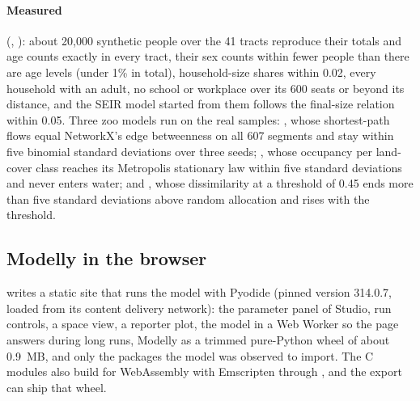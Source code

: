 \paragraph{Measured} (, ): about 20,000 synthetic people
over the 41 tracts reproduce their totals and age counts exactly in every tract, their sex
counts within fewer people than there are age levels (under 1\% in total), household-size
shares within 0.02, every household with an adult, no school or workplace over its 600
seats or beyond its distance, and the SEIR model started from them follows the final-size
relation within 0.05. Three zoo models run on the real samples: , whose
shortest-path flows equal NetworkX's edge betweenness on all 607 segments and stay within
five binomial standard deviations over three seeds; , whose
occupancy per land-cover class reaches its Metropolis stationary law within five standard
deviations and never enters water; and , whose dissimilarity at a
threshold of 0.45 ends more than five standard deviations above random allocation and rises
with the threshold.

\subsection{Modelly in the browser}
\label{app:browser}

 writes a static site that runs the model with Pyodide
\citep{pyodide} (pinned version 314.0.7, loaded from its content delivery network): the parameter panel of Studio,
run controls, a space view, a reporter plot, the model in a Web Worker so the page answers
during long runs, Modelly as a trimmed pure-Python wheel of about 0.9~MB, and only the
packages the model was observed to import. The C modules also build for WebAssembly with
Emscripten through , and the export can ship that wheel.


